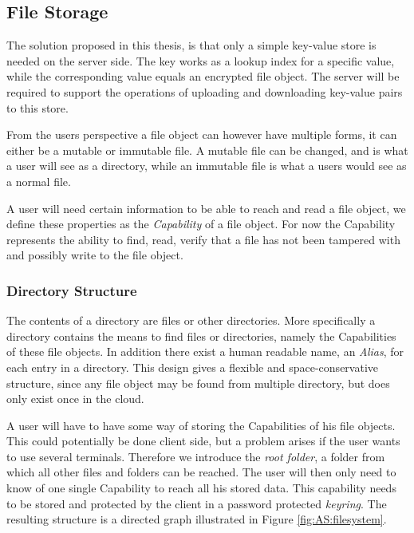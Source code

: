 \documentclass[pdftex,english,10pt,b5paper,twoside]{book}
\begin{document}
\subsection{File Storage}
\label{sec:AS:FS}

The solution proposed in this thesis, is that only a simple key-value store is
needed on the server side. The key works as a lookup index for a specific value,
while the corresponding value equals an encrypted file object. The server will
be required to support the operations of uploading and downloading key-value
pairs to this store.

From the users perspective a file object can however have multiple forms, it
can either be a mutable or immutable file. A mutable file can be changed, and
is what a user will see as a directory, while an immutable file is what a users
would see as a normal file.  

A user will need certain information to be able to reach and read a file
object, we define these properties as the \emph{Capability} of a file object.
For now the Capability represents the ability to find, read, verify that a file
has not been tampered with and possibly write to the file object.


\subsubsection{Directory Structure} 

The contents of a directory are files or other directories. More specifically a
directory contains the means to find files or directories, namely the
Capabilities of these file objects. In addition there exist a human readable
name, an \emph{Alias}, for each entry in a directory. This design gives a
flexible and space-conservative structure, since any file object may be found
from multiple directory, but does only exist once in the cloud.

A user will have to have some way of storing the Capabilities of his file
objects. This could potentially be done client side, but a problem arises if
the user wants to use several terminals. Therefore we introduce the \emph{root
folder}, a folder from which all other files and folders can be reached.  The
user will then only need to know of one single Capability to reach all his
stored data. This capability needs to be stored and protected by the client in
a password protected \emph{keyring}. The resulting structure is a directed
graph illustrated in Figure \ref{fig:AS:filesystem}.
\end{document}

